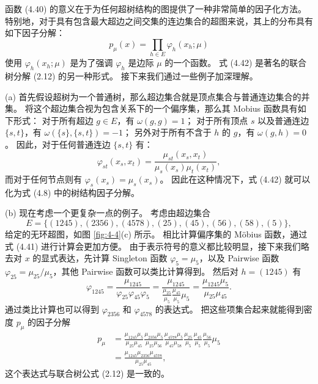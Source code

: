 函数 (4.40) 的意义在于为任何超树结构的图提供了一种非常简单的因子化方法。
特别地，对于具有包含最大超边之间交集的连边集合的超图来说，其上的分布具有如下因子分解：
\begin{equation}
    p_{\mu}(x) = \prod_{h \in E}\varphi_h(x_h; \mu)
\end{equation}
使用 $\varphi_h(x_h; \mu)$ 是为了强调 $\varphi_h$ 是边际 $\mu$ 的一个函数。
式 (4.42) 是著名的联合树分解 (2.12) 的另一种形式。
接下来我们通过一些例子加深理解。

\begin{tcolorbox}
\begin{exam}[超树的因子化]

(a) 首先假设超树为一个普通树，那么超边集合就是顶点集合与普通连边集合的并集。
将这个超边集合视为包含关系下的一个偏序集，那么其 M\:obius 函数具有如下形式：
对于所有超边 $g \in E$，有 $\omega(g, g) = 1$；
对于所有顶点 $s$ 以及普通连边 $\{s, t\}$，有 $\omega(\{s\}, \{s, t\}) = -1$；
另外对于所有不含于 $h$ 的 $g$，有 $\omega(g, h) = 0$。
因此，对于任何普通连边 $\{s, t\}$ 有：
\begin{equation*}
    \varphi_{st}(x_s, x_t) = \frac{\mu_{st}(x_s, x_t)}{\mu_s(x_s)\mu_t(x_t)}, 
\end{equation*}
而对于任何节点则有 $\varphi_s(x_s) = \mu_s(x_s)$。
因此在这种情况下，式 (4.42) 就可以化为式 (4.8) 中的树结构因子分解。

(b) 现在考虑一个更复杂一点的例子。
考虑由超边集合
\begin{equation*}
    E = \{(1245), (2356), (4578), (25), (45), (56), (58), (5)\}, 
\end{equation*}
给定的无环超图，如图 \ref{fig:4-4}(c) 所示。
相比计算偏序集的 M\"obius 函数，通过式 (4.41) 进行计算会更加方便。
由于表示符号的意义都比较明显，接下来我们略去对 $x$ 的显式表达，先计算 Singleton 函数 $\varphi_5 = \mu_5$，以及 Pairwise 函数 $\varphi_{25} = \mu_{25}/\mu_5$，其他 Pairwise 函数可以类比计算得到。
然后对 $h = (1245)$ 有
\begin{equation*}
    \varphi_{1245} = \frac{\mu_{1245}}{\varphi_{25}\varphi_{45}\varphi_5} = \frac{\mu_{1245}}{\frac{\mu_{25}}{\mu_5}\frac{\mu_{45}}{\mu_5}\mu_5} = \frac{\mu_{1245}\mu_5}{\mu_{25}\mu_{45}}.
\end{equation*}
通过类比计算也可以得到 $\varphi_{2356}$ 和 $\varphi_{4578}$ 的表达式。
把这些项集合起来就能得到密度 $p_{\mu}$ 的因子分解
\begin{align*}
    p_{\mu} &= \frac{\mu_{1245}\mu_5}{\mu_{25}\mu_{45}}\frac{\mu_{2356}\mu_5}{\mu_{25}\mu_{56}}\frac{\mu_{4578}\mu_5}{\mu_{45}\mu_{58}}\frac{\mu_{25}}{\mu_5}\frac{\mu_{45}}{\mu_5}\frac{\mu_{56}}{\mu_5}\mu_5 \\
    &= \frac{\mu_{1245}\mu_{2356}\mu_{4578}}{\mu_{25}\mu_{45}}, 
\end{align*}
这个表达式与联合树公式 (2.12) 是一致的。

\end{exam}
\end{tcolorbox}

